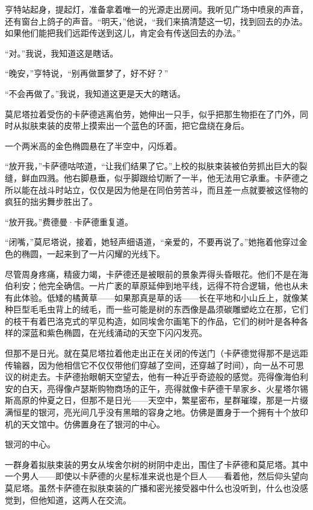 \documentclass[AutoFakeBold=true]{book}
\begin{document}
亨特站起身，提起灯，准备拿着唯一的光源走出房间。我听见广场中喷泉的声音，还有窗台上鸽子的声音。``明天，''他说，``我们来搞清楚这一切，找到回去的办法。如果他们能把我们远距传送到这儿，肯定会有传送回去的办法。''

``对。''我说，我知道这是瞎话。

``晚安，''亨特说，``别再做噩梦了，好不好？''

``不会再做了。''我说，我知道这更是天大的瞎话。

\vspace*{1em}

莫尼塔拉着受伤的卡萨德逃离伯劳，她伸出一只手，似乎把那生物拒在了门外，同时从拟肤束装的皮带上摸索出一个蓝色的环面，把它盘绕在身后。

一个两米高的金色椭圆悬在了半空中，闪烁着。

``放开我，''卡萨德咕哝道，``让我们结果了它。''上校的拟肤束装被伯劳抓出巨大的裂缝，鲜血四溅。他右脚悬垂，似乎脚跟给切断了一半，他无法用它承重。卡萨德之所以能在战斗时站立，仅仅是因为他是在同伯劳苦斗，而且差一点就要被这怪物的疯狂的拙劣舞步胜出了。

``放开我。''费德曼·卡萨德重复道。

``闭嘴，''莫尼塔说，接着，她轻声细语道，``亲爱的，不要再说了。''她拖着他穿过金色的椭圆，一起来到了一片闪耀的光线下。

尽管周身疼痛，精疲力竭，卡萨德还是被眼前的景象弄得头昏眼花。他们不是在海伯利安；他完全确信。一片广袤的草原延伸到地平线，远得不符合逻辑，他也从未有此体验。低矮的橘黄草——如果那真是草的话——长在平地和小山丘上，就像某种巨型毛毛虫背上的绒毛，而一些可能是树的东西像是晶须碳雕塑屹立在那，它们的枝干有着巴洛克式的罕见构造，如同埃舍尔画笔下的作品，它们的树叶是各种各样的深蓝和紫色椭圆，在光线涌动的天空下闪闪发亮。

但那不是日光。就在莫尼塔拉着他走出正在关闭的传送门（卡萨德觉得那不是远距传输器，因为他相信它不仅仅带他们穿越了空间，还穿越了时间），向一丛不可思议的树走去。卡萨德抬眼朝天空望去，他有一种近乎奇迹般的感觉。亮得像海伯利安的白天，亮得像卢瑟斯购物商场的正午，亮得就像卡萨德干旱家乡、火星塔尔锡斯高原的仲夏之日，但那不是日光——天空中，繁星密布，星群璀璨，那是一片缀满恒星的银河，亮光间几乎没有黑暗的容身之地。仿佛是置身于一个拥有十个放印机的天文馆中。仿佛置身在了银河的中心。

银河的中心。

一群身着拟肤束装的男女从埃舍尔树的树阴中走出，围住了卡萨德和莫尼塔。其中一个男人——即使以卡萨德的火星标准来说也是个巨人——看着他，然后仰头望向莫尼塔。虽然卡萨德在拟肤束装的广播和密光接受器中什么也没听到，什么也没感觉到，但他知道，这两人在交流。
\end{document}
